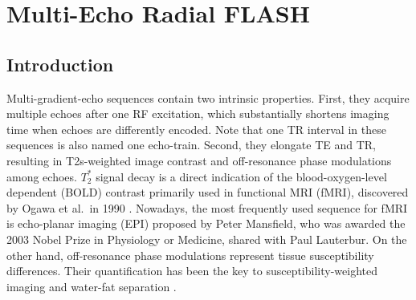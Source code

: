 \chapter{Multi-Echo Radial FLASH} \label{Chp:multi-echo}


\section{Introduction}
Multi-gradient-echo sequences contain two intrinsic properties. First, they acquire multiple echoes after one RF excitation, which substantially shortens imaging time when echoes are differently encoded. Note that one TR interval in these sequences is also named one echo-train. Second, they elongate TE and TR, resulting in \acs{T2s}-weighted image contrast and off-resonance phase modulations among echoes. $T_2^*$ signal decay is a direct indication of the blood-oxygen-level dependent (\acs{BOLD}) contrast primarily used in functional MRI (\acs{fMRI}), discovered by Ogawa et al.~in 1990 \cite{1990_fMRI}. Nowadays, the most frequently used sequence for fMRI is echo-planar imaging (\acs{EPI}) \cite{1998_EPI} proposed by Peter Mansfield, who was awarded the 2003 Nobel Prize in Physiology or Medicine, shared with Paul Lauterbur. On the other hand, off-resonance phase modulations represent tissue susceptibility differences. Their quantification has been the key to susceptibility-weighted imaging \cite{2015_SWI_QSM} and water-fat separation \cite{2004_IDEAL}.

